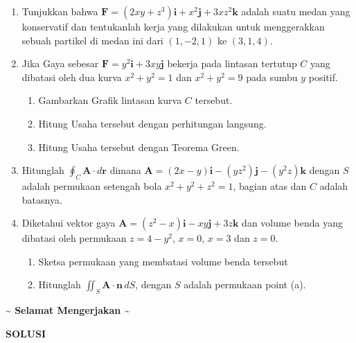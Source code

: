 \documentclass[11pt,letterpaper]{article}
\begin{document}
\vspace{0.25cm}
\begin{enumerate}
    \item Tunjukkan bahwa $\mathbf{F} = (2xy + z^3)\mathbf{i} + x^2\mathbf{j} + 3xz^2\mathbf{k}$ adalah suatu medan yang konservatif dan tentukanlah kerja yang dilakukan untuk menggerakkan sebuah partikel di medan ini dari $(1, -2, 1)$ ke $(3, 1, 4)$.

    \item Jika Gaya sebesar $\mathbf{F} = y^2\mathbf{i} + 3xy\mathbf{j}$ bekerja pada lintasan tertutup $C$ yang dibatasi oleh dua kurva $x^2 + y^2 = 1$ dan $x^2 + y^2 = 9$ pada sumbu $y$ positif.
          \begin{enumerate}[label=\alph*.]
              \item Gambarkan Grafik lintasan kurva $C$ tersebut.
              \item Hitung Usaha tersebut dengan perhitungan langsung.
              \item Hitung Usaha tersebut dengan Teorema Green.
          \end{enumerate}

    \item Hitunglah $\oint_C \mathbf{A} \cdot d\mathbf{r}$ dimana $\mathbf{A} = (2x - y)\mathbf{i} - (yz^2)\mathbf{j} - (y^2z)\mathbf{k}$ dengan $S$ adalah permukaan setengah bola $x^2 + y^2 + z^2 = 1$, bagian atas dan $C$ adalah batasnya.

    \item Diketahui vektor gaya $\mathbf{A} = (z^2 - x)\mathbf{i} - xy\mathbf{j} + 3z\mathbf{k}$ dan volume benda yang dibatasi oleh permukaan $z = 4 - y^2$, $x = 0$, $x = 3$ dan $z = 0$.
          \begin{enumerate}[label=\alph*)]
              \item Sketsa permukaan yang membatasi volume benda tersebut
              \item Hitunglah $\iint_S \mathbf{A} \cdot \mathbf{n} \, dS$, dengan $S$ adalah permukaan point (a).
          \end{enumerate}
\end{enumerate}

\vspace{0.5cm}
\begin{center}
    \textbf{\~{} Selamat Mengerjakan \~{}}
\end{center}

\newpage
\begin{center}
    \textbf{SOLUSI}
\end{center}
\end{document}
